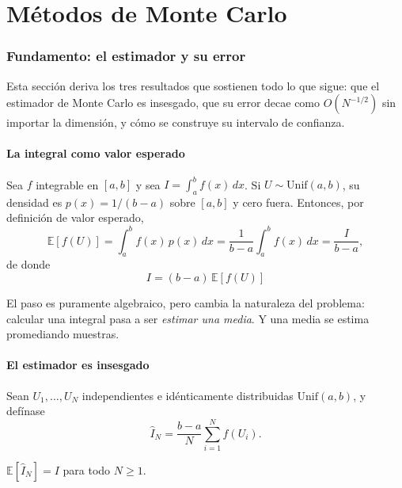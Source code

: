 \part{Métodos de Monte Carlo}

\section{Fundamento: el estimador y su error}
\label{sec:mc-fundamento}

Esta sección deriva los tres resultados que sostienen todo lo que sigue: que el
estimador de Monte Carlo es insesgado, que su error decae como $O(N^{-1/2})$
sin importar la dimensión, y cómo se construye su intervalo de confianza.

\subsection{La integral como valor esperado}

Sea $f$ integrable en $[a,b]$ y sea $I = \int_a^b f(x)\,dx$. Si
$U \sim \mathrm{Unif}(a,b)$, su densidad es $p(x) = 1/(b-a)$ sobre $[a,b]$ y
cero fuera. Entonces, por definición de valor esperado,
\begin{equation}
  \mathbb{E}[f(U)] = \int_a^b f(x)\, p(x)\, dx
  = \frac{1}{b-a}\int_a^b f(x)\,dx = \frac{I}{b-a},
  \label{eq:esperanza}
\end{equation}
de donde
\begin{equation}
  \boxed{\;I = (b-a)\,\mathbb{E}[f(U)]\;}
  \label{eq:integral-esperanza}
\end{equation}

El paso es puramente algebraico, pero cambia la naturaleza del problema:
calcular una integral pasa a ser \emph{estimar una media}. Y una media se
estima promediando muestras.

\subsection{El estimador es insesgado}

Sean $U_1, \dots, U_N$ independientes e idénticamente distribuidas
$\mathrm{Unif}(a,b)$, y defínase
\begin{equation}
  \hat I_N = \frac{b-a}{N}\sum_{i=1}^{N} f(U_i).
  \label{eq:estimador}
\end{equation}

\begin{teorema}[Insesgadez]
\label{teo:insesgado}
$\mathbb{E}[\hat I_N] = I$ para todo $N \ge 1$.
\end{teorema}

